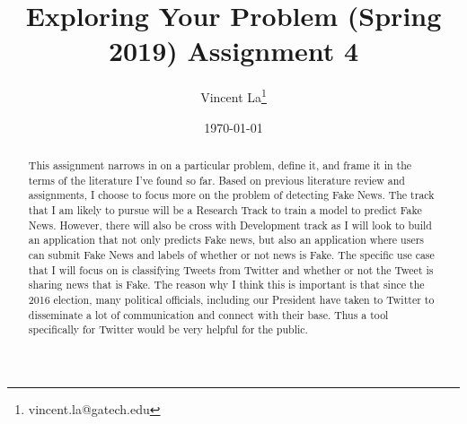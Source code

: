 \documentclass[12pt, final]{article}
\renewcommand{\thefootnote}{$\star$}
\begin{document}
\title{Exploring Your Problem (Spring 2019) Assignment 4}

\date{\today}

\renewcommand{\thefootnote}{$\dag$}
\author{Vincent La\footnote{vincent.la@gatech.edu}}

\maketitle

\begin{abstract}
This assignment narrows in on a particular problem, define it, and frame it in the terms of the literature I've found so far. Based on previous literature review and assignments, I choose to focus more on the problem of detecting Fake News. The track that I am likely to pursue will be a Research Track to train a model to predict Fake News. However, there will also be cross with Development track as I will look to build an application that not only predicts Fake news, but also an application where users can submit Fake News and labels of whether or not news is Fake. The specific use case that I will focus on is classifying Tweets from Twitter and whether or not the Tweet is sharing news that is Fake. The reason why I think this is important is that since the 2016 election, many political officials, including our President have taken to Twitter to disseminate a lot of communication and connect with their base. Thus a tool specifically for Twitter would be very helpful for the public.
\end{abstract} 

\newpage
\renewcommand{\thefootnote}{\number\value{footnote}} 
\end{document}
